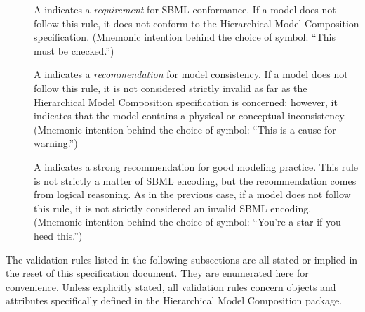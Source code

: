 \begin{description}

\item[\hspace*{7.8pt}\vSymbol] A \vSymbolName indicates a
  \emph{requirement} for SBML conformance. If a model does not follow
  this rule, it does not conform to the Hierarchical Model Composition
  specification.  (Mnemonic intention behind the choice of symbol:
  ``This must be checked.'')

\item[\hspace*{8.7pt}\cSymbol] A \cSymbolName indicates a
  \emph{recommendation} for model consistency.  If a model does not
  follow this rule, it is not considered strictly invalid as far as
  the Hierarchical Model Composition specification is concerned;
  however, it indicates that the model contains a physical or
  conceptual inconsistency.  (Mnemonic intention behind the choice of
  symbol: ``This is a cause for warning.'')

\item[\hspace*{7.5pt}\mSymbol] A \mSymbolName indicates a strong
  recommendation for good modeling practice.  This rule is not
  strictly a matter of SBML encoding, but the recommendation comes
  from logical reasoning.  As in the previous case, if a model does
  not follow this rule, it is not strictly considered an invalid SBML
  encoding.  (Mnemonic intention behind the choice of symbol: ``You're
  a star if you heed this.'')

\end{description}

The validation rules listed in the following subsections are all stated
or implied in the reset of this specification document.  They are
enumerated here for convenience.  Unless explicitly stated, all
validation rules concern objects and attributes specifically defined in
the Hierarchical Model Composition package.



